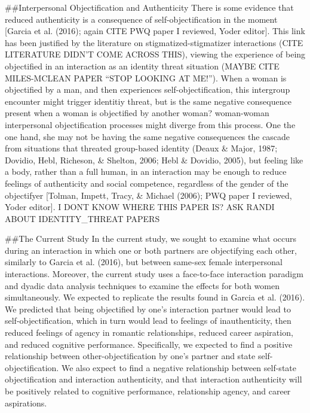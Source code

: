 \documentclass[
  man]{apa6}
\begin{document}
\#\#Interpersonal Objectification and Authenticity
There is some evidence that reduced authenticity is a consequence of self-objectification in the moment {[}Garcia et al. (2016); again CITE PWQ paper I reviewed, Yoder editor{]}. This link has been justified by the literature on stigmatized-stigmatizer interactions (CITE LITERATURE DIDN'T COME ACROSS THIS), viewing the experience of being objectified in an interaction as an identity threat situation (MAYBE CITE MILES-MCLEAN PAPER \enquote{STOP LOOKING AT ME!}). When a woman is objectified by a man, and then experiences self-objectification, this intergroup encounter might trigger identitiy threat, but is the same negative consequence present when a woman is objectified by another woman? woman-woman interpersonal objectification processes might diverge from this process. One the one hand, she may not be having the same negative consequences the cascade from situations that threated group-based identity (Deaux \& Major, 1987; Dovidio, Hebl, Richeson, \& Shelton, 2006; Hebl \& Dovidio, 2005), but feeling like a body, rather than a full human, in an interaction may be enough to reduce feelings of authenticity and social competence, regardless of the gender of the objectifyer {[}Tolman, Impett, Tracy, \& Michael (2006); PWQ paper I reviewed, Yoder editor{]}. I DONT KNOW WHERE THIS PAPER IS? ASK RANDI ABOUT IDENTITY\_THREAT PAPERS

\#\#The Current Study
In the current study, we sought to examine what occurs during an interaction in which one or both partners are objectifying each other, similarly to Garcia et al. (2016), but between same-sex female interpersonal interactions. Moreover, the current study uses a face-to-face interaction paradigm and dyadic data analysis techniques to examine the effects for both women simultaneously. We expected to replicate the results found in Garcia et al. (2016). We predicted that being objectified by one's interaction partner would lead to self-objectification, which in turn would lead to feelings of inauthenticity, then reduced feelings of agency in romantic relationships, reduced career aspiration, and reduced cognitive performance. Specifically, we expected to find a positive relationship between other-objectification by one's partner and state self-objectification. We also expect to find a negative relationship between self-state objectification and interaction authenticity, and that interaction authenticity will be positively related to cognitive performance, relationship agency, and career aspirations.
\end{document}
